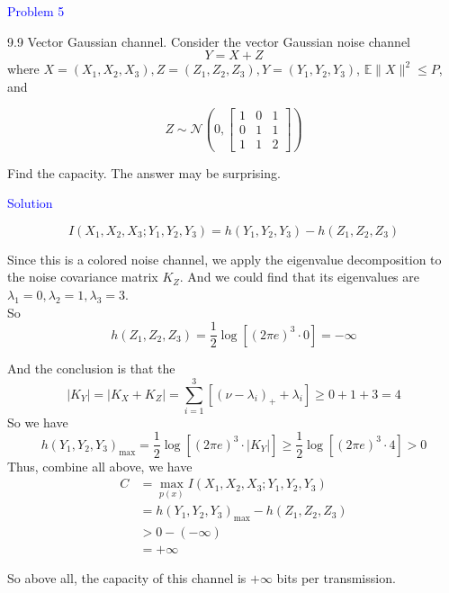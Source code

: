 \textcolor{blue}{Problem 5}

9.9 Vector Gaussian channel. Consider the vector Gaussian noise channel
$$Y=X+Z$$
where $X=\left(X_1, X_2, X_3\right), Z=\left(Z_1, Z_2, Z_3\right), Y=\left(Y_1, Y_2, Y_3\right)$, $\mathbb{E}\|X\|^2 \leq P$, and

$$
Z \sim \mathcal{N}\left(0,\left[\begin{array}{lll}
1 & 0 & 1 \\
0 & 1 & 1 \\
1 & 1 & 2
\end{array}\right]\right)
$$

Find the capacity. The answer may be surprising.

\textcolor{blue}{Solution}

$$I(X_1,X_2,X_3;Y_1,Y_2,Y_3)=h(Y_1,Y_2,Y_3)-h(Z_1,Z_2,Z_3)$$

Since this is a colored noise channel, we apply the eigenvalue decomposition to the noise covariance matrix $K_Z$. And we could find that its eigenvalues are $\lambda_1=0, \lambda_2=1,\lambda_3=3$. \\
So
$$h(Z_1,Z_2,Z_3)=\dfrac{1}{2}\log\left[(2\pi e)^3\cdot 0\right]=-\infty$$

And the conclusion is that the
$$|K_Y|=|K_X+K_Z|=\sum_{i=1}^3\left[\left(\nu-\lambda_i\right)_+ + \lambda_i\right]\geq 0+1+3=4$$
So we have
$$h(Y_1,Y_2,Y_3)_{\max}=\dfrac{1}{2}\log\left[(2\pi e)^3\cdot|K_Y|\right]\geq \dfrac{1}{2}\log\left[(2\pi e)^3\cdot 4\right]>0$$
Thus, combine all above, we have
\begin{align*}
C &= \max_{p(x)}I(X_1,X_2,X_3;Y_1,Y_2,Y_3) \\
&= h(Y_1,Y_2,Y_3)_{\max} - h(Z_1,Z_2,Z_3) \\
&> 0 - (-\infty) \\
&= +\infty
\end{align*}

So above all, the capacity of this channel is $+\infty$ bits per transmission.

\newpage